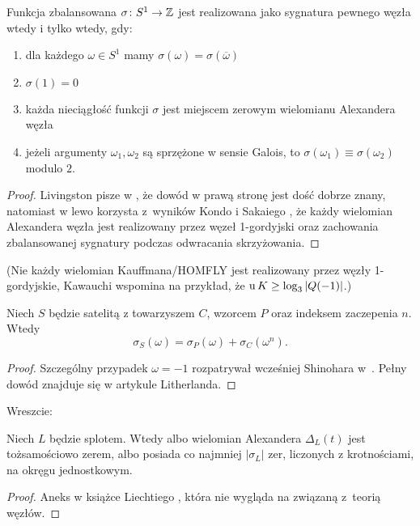 \begin{proposition}
\label{balanced_iff_four_conditions}%
    Funkcja zbalansowana $\sigma \colon S^1 \to \mathbb Z$ jest realizowana jako sygnatura pewnego węzła wtedy i tylko wtedy, gdy:
    \begin{enumerate}
        \item dla każdego $\omega \in S^1$ mamy $\sigma(\omega) = \sigma(\overline{\omega})$
        \item $\sigma(1) = 0$
        \item każda nieciągłość funkcji $\sigma$ jest miejscem zerowym wielomianu Alexandera węzła
        \item jeżeli argumenty $\omega_1, \omega_2$ są sprzężone w sensie Galois, to $\sigma(\omega_1) \equiv \sigma(\omega_2)$ modulo $2$.
    \end{enumerate}
\end{proposition}

\begin{proof}
    Livingston pisze w \cite{livingston18}, że dowód w prawą stronę jest dość dobrze znany, natomiast w lewo korzysta z~wyników Kondo \cite{kondo79} i Sakaiego \cite{sakai77}, że każdy wielomian Alexandera węzła jest realizowany przez węzeł 1-gordyjski oraz zachowania zbalansowanej sygnatury podczas odwracania skrzyżowania.
\end{proof}

(Nie każdy wielomian Kauffmana/HOMFLY jest realizowany przez węzły 1-gordyjskie, Kawauchi \cite[s. 151]{kawauchi96} wspomina na przykład, że $\operatorname{u} K \ge \log_3 |Q(-1)|$.)

\begin{proposition}
%
    Niech $S$ będzie satelitą z towarzyszem $C$, wzorcem $P$ oraz indeksem zaczepenia $n$.
    Wtedy
    \begin{equation}
        \sigma_S(\omega) = \sigma_P(\omega) + \sigma_C(\omega^n).
    \end{equation}
\end{proposition}

\begin{proof}
    Szczególny przypadek $\omega = -1$ rozpatrywał wcześniej Shinohara w~\cite{shinohara71}.
%
    Pełny dowód znajduje się w artykule \cite{litherland79} Litherlanda.
%
\end{proof}

Wreszcie:

\begin{proposition}
    Niech $L$ będzie splotem.
    Wtedy albo wielomian Alexandera $\Delta_L(t)$ jest tożsamościowo zerem, albo posiada co najmniej $|\sigma_L|$ zer, liczonych z krotnościami, na okręgu jednostkowym.
\end{proposition}

\begin{proof}
    Aneks w książce Liechtiego \cite{liechti16}, która nie wygląda na związaną z~teorią węzłów.
\end{proof}



